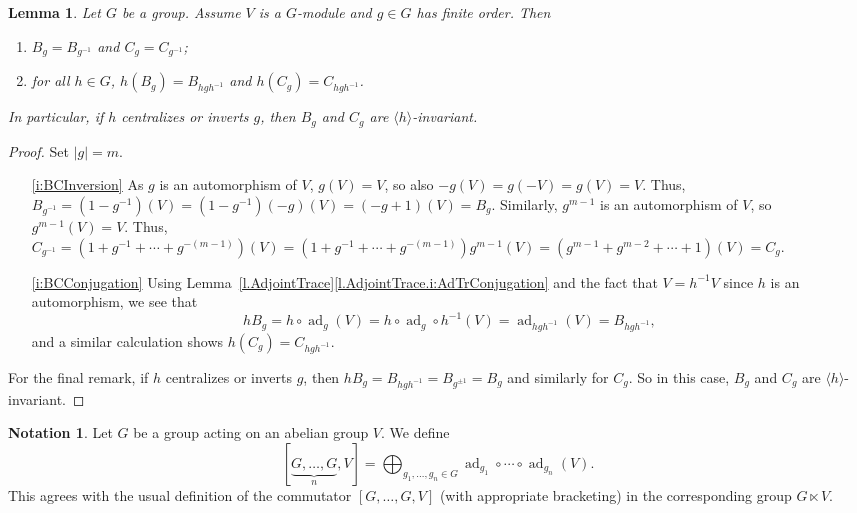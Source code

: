 \documentclass[a4paper, 11pt]{amsart}
\theoremstyle{plain}
\newtheorem{lemma}[theorem]{Lemma}
\theoremstyle{definition}
\newtheorem*{notation}{Notation}
\theoremstyle{remark}
\DeclareMathOperator{\ad}{ad}
\begin{document}
\begin{lemma}\label{l.PermutingBandC}
Let $G$ be a group. Assume $V$ is a $G$-module and $g\in G$ has finite order. Then
\begin{enumerate}
    \item\label{i:BCInversion} $B_g = B_{g^{-1}}$ and $C_g = C_{g^{-1}}$;
    \item\label{i:BCConjugation} for all $h\in G$, $h(B_g) = B_{hgh^{-1}}$ and $h(C_g) = C_{hgh^{-1}}$.
\end{enumerate}
In particular, if $h$ centralizes or inverts $g$, then $B_g$ and $C_g$  are $\langle h\rangle $-invariant.
\end{lemma}
\begin{proof}
Set $|g|=m$.
\begin{enumerate}
\item[\eqref{i:BCInversion}] As $g$ is an automorphism of $V$, $g(V) = V$, so also $-g(V) = g(-V) = g(V) = V$. Thus, 
$B_{g^{-1}} = (1-g^{-1})(V) = (1-g^{-1})(-g)(V) = (-g+1)(V) = B_g$. Similarly, $g^{m-1}$ is an automorphism of $V$, so $g^{m-1}(V) = V$. Thus, $C_{g^{-1}} = (1+g^{-1}+\cdots+g^{-(m-1)})(V) = (1+g^{-1}+\cdots+g^{-(m-1)})g^{m-1}(V)  = (g^{m-1}+g^{m-2}+\cdots+1)(V) = C_{g}$. 
\item[\eqref{i:BCConjugation}] Using Lemma~\ref{l.AdjointTrace}\eqref{l.AdjointTrace.i:AdTrConjugation} and the fact that $V = h^{-1}V$ since $h$ is an automorphism, we see that
\[
hB_{g} = h\circ \ad_g(V) = h\circ \ad_g\circ h^{-1}(V) = \ad_{hgh^{-1}}(V) = B_{hgh^{-1}},
\]
and a similar calculation shows $h(C_g) = C_{hgh^{-1}}$.
\end{enumerate}

For the final remark, if $h$ centralizes or inverts $g$, then $hB_{g}=B_{hgh^{-1}} = B_{g^{\pm1}} = B_g$ and similarly for $C_{g}$. So in this case, $B_g$ and $C_g$  are $\langle h\rangle $-invariant.
\end{proof}

\begin{notation}
Let $G$ be a group acting on an abelian group $V$. We define \[[\underbrace{G,\ldots,G}_n,V] = \bigoplus_{g_1,\ldots,g_n\in G} \ad_{g_1}\circ \cdots \circ \ad_{g_n} (V).\]
This agrees with the usual definition of the commutator  $[G,\ldots,G,V]$ (with appropriate bracketing) in the corresponding group $G\ltimes V$.
\end{notation}
\end{document}
